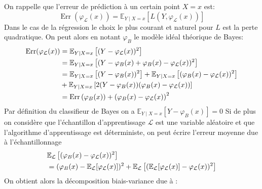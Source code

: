 On rappelle que l'erreur de prédiction à un certain point $X=x$ est:
\begin{equation}
    \operatorname{Err} (\varphi_{\mathcal{L}} (x) ) = \mathbb{E}_{Y \mid X = x} \left[ L(Y,\varphi_{\mathcal{L}} (x) ) \right]
\end{equation}
Dans le cas de la régression le choix le plus courant et naturel pour $L$ est la perte quadratique. On peut alors en notant $\varphi_B$ le modèle idéal théorique de Bayes:
\begin{align*}
    \operatorname{Err} (\varphi_{\mathcal{L}} (x) ) &= \mathbb{E}_{Y \mid X = x} \left[ (Y - \varphi_{\mathcal{L}} (x) )^2 \right]  \notag \\
    &= \mathbb{E}_{Y \mid X = x} \left[ (Y - \varphi_{B} (x) + \varphi_{B} (x) - \varphi_{\mathcal{L}} (x) )^2 \right]  \notag \\
    &= \mathbb{E}_{Y \mid X = x} \left[ (Y - \varphi_{B} (x) )^2 \right]  + \mathbb{E}_{Y \mid X = x} \left[ (\varphi_{B} (x) - \varphi_{\mathcal{L}} (x) )^2 \right]  \notag \\
    &+ \mathbb{E}_{Y \mid X = x} \left[ 2 (Y-\varphi_B (x) ) ( \varphi_B (x) - \varphi_{\mathcal{L}} (x) ) \right] \notag \\
    &= \operatorname{Err} \left(\varphi_{B} (x) \right) + \left( \varphi_{B} (x) - \varphi_{\mathcal{L}} (x) \right)^2
\end{align*}
Par définition du classifieur de Bayes on a $\mathbb{E}_{Y \mid X = x} \left[ Y - \varphi_B (x) \right] = 0$
Si de plus on considère que l'échantillon d'apprentissage $\mathcal{L}$ est une variable aléatoire et que l'algorithme d'apprentissage est déterministe, on peut écrire l'erreur moyenne due à l'échantillonnage
\begin{align}
    &\mathbb{E}_{\mathcal{L}} \left[ ( \varphi_B (x) - \varphi_{\mathcal{L}} (x) )^2 \right] \notag \\
    &= ( \varphi_B (x) - \mathbb{E}_{\mathcal{L}} [ \varphi_{\mathcal{L}} (x) ] )^2 + \mathbb{E}_{\mathcal{L}} \left[ ( \mathbb{E}_{\mathcal{L}} [ \varphi_{\mathcal{L}} (x) ] -  \varphi_{\mathcal{L}} (x) )^2 \right]
\end{align}
On obtient alors la décomposition biais-variance due à \citet{Geman1992}:
